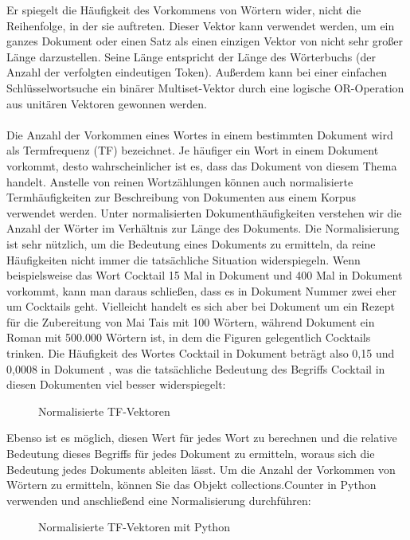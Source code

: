 Er spiegelt die Häufigkeit des Vorkommens von Wörtern wider, nicht die Reihenfolge, in der sie auftreten. 
Dieser Vektor kann verwendet werden, um ein ganzes Dokument oder einen Satz als einen einzigen Vektor von nicht sehr großer Länge darzustellen. 
Seine Länge entspricht der Länge des Wörterbuchs (der Anzahl der verfolgten eindeutigen Token). 
Außerdem kann bei einer einfachen Schlüsselwortsuche ein binärer Multiset-Vektor durch eine logische OR-Operation aus unitären Vektoren gewonnen werden.\\\\
Die Anzahl der Vorkommen eines Wortes in einem bestimmten Dokument wird als Termfrequenz (\ac{TF}) bezeichnet. 
Je häufiger ein Wort in einem Dokument vorkommt, desto wahrscheinlicher ist es, dass das Dokument von diesem Thema handelt. 
Anstelle von reinen Wortzählungen können auch normalisierte Termhäufigkeiten zur Beschreibung von Dokumenten aus einem Korpus verwendet werden. 
Unter normalisierten Dokumenthäufigkeiten verstehen wir die Anzahl der Wörter im Verhältnis zur Länge des Dokuments. 
Die Normalisierung ist sehr nützlich, um die Bedeutung eines Dokuments zu ermitteln, da reine Häufigkeiten nicht immer die tatsächliche Situation widerspiegeln. 
Wenn beispielsweise das Wort \glqq Cocktail\grqq{} 15 Mal in Dokument  und 400 Mal in Dokument  vorkommt, kann man daraus schließen, dass es in Dokument Nummer zwei eher um Cocktails geht.
Vielleicht handelt es sich aber bei Dokument  um ein Rezept für die Zubereitung von Mai Tais mit 100 Wörtern, während Dokument  ein Roman mit 500.000 Wörtern ist, in dem die Figuren gelegentlich Cocktails trinken. 
Die Häufigkeit des Wortes \glqq Cocktail\grqq{} in Dokument  beträgt also 0,15 und 0,0008 in Dokument , was die tatsächliche Bedeutung des Begriffs \glqq Cocktail\grqq{} in diesen Dokumenten viel besser widerspiegelt:
\begin{figure}[H]
    \centering
    \caption{\label{figure:Norm_Vektoren}Normalisierte \ac{TF}-Vektoren}
\end{figure}
\noindent
Ebenso ist es möglich, diesen Wert für jedes Wort zu berechnen und die relative Bedeutung dieses Begriffs für jedes Dokument zu ermitteln, woraus sich die Bedeutung jedes Dokuments ableiten lässt. 
Um die Anzahl der Vorkommen von Wörtern zu ermitteln, können Sie das Objekt collections.Counter in Python verwenden und anschließend eine Normalisierung durchführen:
\begin{figure}[H]
    \centering
    \caption{\label{figure:Norm_Vektoren_Python}Normalisierte \ac{TF}-Vektoren mit Python}
\end{figure}
